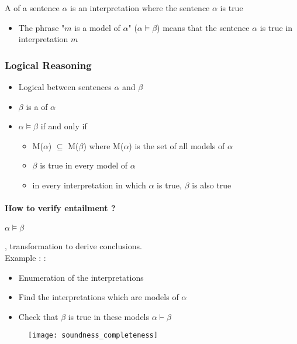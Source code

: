 A  of a sentence $\alpha$ is an interpretation where the sentence $\alpha$ is true
\begin{itemize}
\item The phrase "$m$ is a model of $\alpha$" ($\alpha \models \beta$) means that the sentence $\alpha$ is true in interpretation $m$
\end{itemize}

\subsubsection{Logical Reasoning}

\begin{itemize}
\item Logical  between sentences $\alpha$ and $\beta$
\item $\beta$ is a  of $\alpha$
\item $\alpha \models \beta$ if and only if
	\begin{itemize}
	\item M($\alpha$) $\subseteq$ M($\beta$) where M($\alpha$) is the set of all models of $\alpha$
	\item $\beta$ is true in every model of $\alpha$
	\item in every interpretation in which $\alpha$ is true, $\beta$ is also true
	\end{itemize}
\end{itemize}

\paragraph{How to verify entailment ?}

$\alpha \models \beta$

, transformation to derive conclusions.\\
Example :  :
\begin{itemize}
\item Enumeration of the interpretations
\item Find the interpretations which are models of $\alpha$
\item Check that $\beta$ is true in these models $\alpha \vdash \beta$
\end{itemize}

\begin{figure}[H]
    \centering
    \texttt{[image: soundness\_completeness]}
\end{figure}


